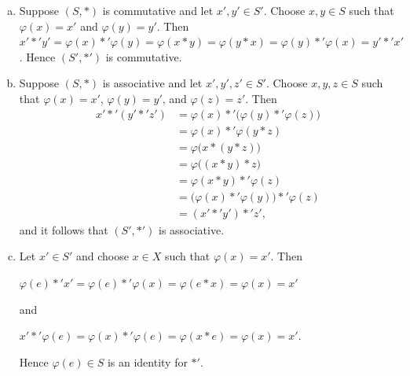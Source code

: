 \documentclass[11pt,fleqn,dvipsnames,usenames]{article}
\newcommand{\p}{\noindent}
\begin{document}
\begin{enumerate}[1.]
\solution
\begin{enumerate}[(a)]
\item Suppose $(S,*)$ is commutative and let $x',y'\in S'$.  Choose $x,y\in S$ such that $\varphi(x) = x'$ and $\varphi(y) = y'$.
Then $x' *' y' = \varphi(x)*'\varphi(y) = \varphi(x*y) = \varphi(y*x) = \varphi(y)*'\varphi(x) = y'*'x'$.  Hence $(S',*')$ is commutative.
\item Suppose $(S,*)$ is associative and let $x',y',z'\in S'$.  Choose $x,y,z\in S$ such that $\varphi(x) = x'$, $\varphi(y) = y'$, and $\varphi(z) = z'$.  Then
\begin{align*}
x' *' (y'*'z') &= \varphi(x)*'\big(\varphi(y) *'\varphi(z)\big)\\
&= \varphi(x) *' \varphi(y*z)\\
&= \varphi\big(x*(y*z)\big)\\
&= \varphi\big((x*y)*z\big)\\
&= \varphi(x*y) *' \varphi(z)\\
&= \big(\varphi(x) *'\varphi(y)\big)*'\varphi(z)\\
&= (x' *' y')*'z',
\end{align*}
and it follows that $(S',*')$ is associative.
\item Let $x'\in S'$ and choose $x\in X$ such that $\varphi(x) = x'$.  Then
\begin{center}
$\varphi(e)*' x' = \varphi(e) *'\varphi(x) = \varphi(e*x) = \varphi(x) = x'$
\end{center}
and
\begin{center}
$x'*'\varphi(e) = \varphi(x)*'\varphi(e) = \varphi(x*e) = \varphi(x) = x'$.
\end{center}
Hence $\varphi(e)\in S$ is an identity for $*'$.
\end{enumerate}
\end{enumerate}
\vsp

\p {\huge \S4.3 Problems}
\vsp
\end{document}
